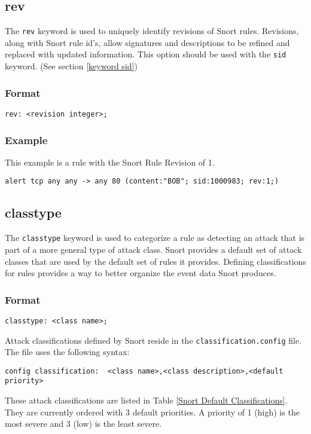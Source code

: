 \documentclass[english]{report}
\begin{document}
\subsection{rev \label{keyword rev}}

The \texttt{rev} keyword is used to uniquely identify revisions of Snort rules.
Revisions, along with Snort rule id's, allow signatures and descriptions to be
refined and replaced with updated information.  This option should be used with
the \texttt{sid} keyword.  (See section \ref{keyword sid})

\subsubsection{Format}

\begin{verbatim}
rev: <revision integer>;
\end{verbatim}

\subsubsection{Example}
This example is a rule with the Snort Rule Revision of 1.
\begin{verbatim}
alert tcp any any -> any 80 (content:"BOB"; sid:1000983; rev:1;)
\end{verbatim}

\subsection{classtype}

The \texttt{classtype} keyword is used to categorize a rule as detecting an attack that is
part of a more general type of attack class. Snort provides a default set of attack classes
that are used by the default set of rules it provides. Defining classifications for rules
provides a way to better organize the event data Snort produces.

\subsubsection{Format}

\begin{verbatim}
classtype: <class name>;
\end{verbatim}
Attack classifications defined by Snort reside in the \texttt{classification.config}
file. The file uses the following syntax:

\begin{verbatim}
config classification:  <class name>,<class description>,<default priority>
\end{verbatim}
These attack classifications are listed in Table
\ref{Snort Default Classifications}. They
are currently ordered with 3 default priorities. A priority of 1 (high) is the
most severe and 3 (low) is the least severe.
\end{document}
